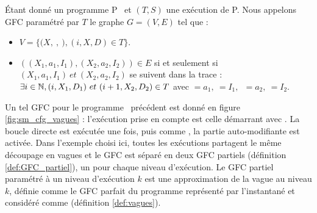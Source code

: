 
\begin{defi}
 Étant donné un programme P \sm\ et $(T, S)$ une exécution de P.
 Nous appelons GFC paramétré par $T$ le graphe $G=(V, E)$ tel que :
 \begin{itemize}
  \item $V=\{(X,\ $$,\ $$), (i, X, D)\in T\}$.%
  \item $((X_1, a_1, I_1), (X_2, a_2, I_2))\in E$ si et seulement si $(X_1, a_1,
I_1)\ et\ (X_2, a_2, I_2)$ se suivent dans la trace : $\exists i\in \mathbb N, (i, X_1, D_1)\ et\ (i+1, X_2, D_2)\in T$ avec $=a_1,\ $$=I_1,$~$=a_2,\ $$=I_2$.
 \end{itemize}
\label{def:cfg_param_sm}
\end{defi}


Un tel GFC pour le programme \sm\ précédent est donné en figure \ref{fig:sm_cfg_vagues} : l'exécution prise en compte est celle démarrant avec . La boucle directe est exécutée une fois, puis comme , la partie auto-modifiante est activée. 
Dans l'exemple choisi ici, toutes les exécutions partagent le même découpage en vagues et le GFC est séparé en deux GFC partiels (définition \ref{def:GFC_partiel}), un pour chaque niveau d'exécution. Le GFC partiel paramétré à un niveau d'exécution $k$ est une approximation de la vague au niveau $k$, définie comme le GFC parfait du programme représenté par l'instantané et considéré comme \nsm (définition \ref{def:vagues}).


